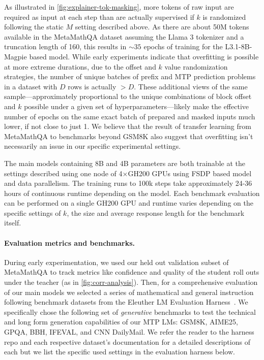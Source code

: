 \documentclass{article}
\theoremstyle{plain}
\theoremstyle{definition}
\theoremstyle{remark}
\begin{document}
As illustrated in \cref{fig:explainer-tok-masking}, more tokens of raw input are required as input at each step than are actually supervised if $k$ is randomized following the static $M$ setting described above. As there are about 50M tokens available in the MetaMathQA dataset assuming the Llama 3 tokenizer and a truncation length of 160, this results in $\sim35$ epochs of training for the L3.1-8B-Magpie based model. While early experiments indicate that overfitting is possible at more extreme durations, due to the offset and $k$ value randomization strategies, the number of unique batches of prefix and MTP prediction problems in a dataset with $D$ rows is actually $>D$. These additional views of the same sample---approximately proportional to the unique combinations of block offset and $k$ possible under a given set of hyperparameters---likely make the effective number of epochs on the same exact batch of prepared  and masked inputs much lower, if not close to just 1. We believe that the result of transfer learning from MetaMathQA to benchmarks beyond GSM8K also suggest that overfitting isn't necessarily an issue in our specific experimental settings.

The main models containing 8B and 4B parameters are both trainable at the settings described using one node of 4$\times$GH200 GPUs using FSDP based model and data parallelism. The training runs to 100k steps take approximately 24-36 hours of continuous runtime depending on the model. Each benchmark evaluation can be performed on a single GH200 GPU and runtime varies depending on the specific settings of $k$, the size and average response length for the benchmark itself.


\paragraph{Evaluation metrics and benchmarks.}

During early experimentation, we used our held out validation subset of MetaMathQA to track metrics like confidence and quality of the student roll outs under the teacher (as in \cref{fig:corr-analysis}). Then, for a comprehensive evaluation of our main models we selected a series of mathematical and general instruction following benchmark datasets from the Eleuther LM Evaluation Harness~\citep{eval-harness}. We specifically chose the following set of \textit{generative} benchmarks to test the technical and long form generation capabilities of our MTP LMs: GSM8K, AIME25, GPQA, BBH, IFEVAL, and CNN DailyMail. We refer the reader to the harness repo and each respective dataset's documentation for a detailed descriptions of each but we list the specific used settings in the evaluation harness below.
\end{document}
